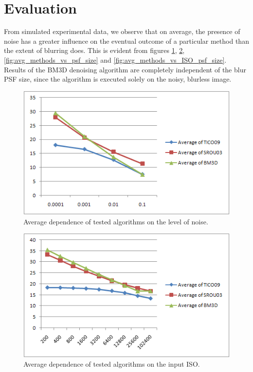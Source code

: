 \documentclass[12pt,notitlepage]{report}
\begin{document}
\section{Evaluation}
\label{sec:evaluation}

From simulated experimental data, we observe that on average, the presence of noise has a greater influence on the eventual outcome of a particular method than the extent of blurring does. This is evident from figures \ref{fig:avg_methods_vs_var}, \ref{fig:avg_methods_vs_ISO}, \ref{fig:avg_methods_vs_psf_size} and \ref{fig:avg_methods_vs_ISO_psf_size}. Results of the BM3D denoising algorithm are completely independent of the blur PSF size, since the algorithm is executed solely on the noisy, blurless image. 

\begin{figure}[htb]
 \begin{center}
  \includegraphics[width=12cm]{avg_methods_vs_var.png}
 \end{center}
 \caption{Average dependence of tested algorithms on the level of noise.}
 \label{fig:avg_methods_vs_var}
\end{figure}

\begin{figure}[htb]
 \begin{center}
  \includegraphics[width=12cm]{avg_methods_vs_ISO.png}
 \end{center}
 \caption{Average dependence of tested algorithms on the input ISO.}
 \label{fig:avg_methods_vs_ISO}
\end{figure}
\end{document}
